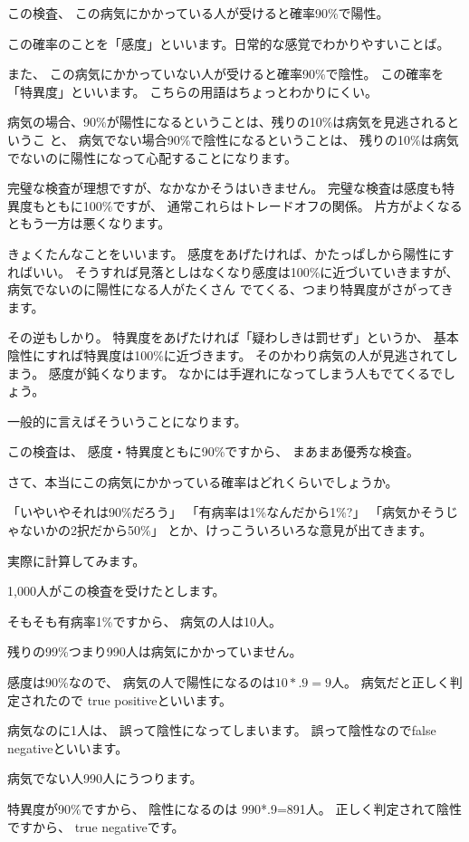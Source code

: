 \documentclass[uplatex,jis2004,dvipdfmx,12pt]{jsarticle}
\begin{document}
この検査、
この病気にかかっている人が受けると確率90\%で陽性。

この確率のことを「感度」といいます。日常的な感覚でわかりやすいことば。

また、
この病気にかかっていない人が受けると確率90\%で陰性。
この確率を「特異度」といいます。
こちらの用語はちょっとわかりにくい。

病気の場合、90\%が陽性になるということは、残りの10\%は病気を見逃されるというこ
と、
病気でない場合90\%で陰性になるということは、
残りの10\%は病気でないのに陽性になって心配することになります。

完璧な検査が理想ですが、なかなかそうはいきません。
完璧な検査は感度も特異度もともに100\%ですが、
通常これらはトレードオフの関係。
片方がよくなるともう一方は悪くなります。

きょくたんなことをいいます。
感度をあげたければ、かたっぱしから陽性にすればいい。
そうすれば見落としはなくなり感度は100\%に近づいていきますが、
病気でないのに陽性になる人がたくさん
でてくる、つまり特異度がさがってきます。

その逆もしかり。
特異度をあげたければ「疑わしきは罰せず」というか、
基本陰性にすれば特異度は100\%に近づきます。
そのかわり病気の人が見逃されてしまう。
感度が鈍くなります。
なかには手遅れになってしまう人もでてくるでしょう。

一般的に言えばそういうことになります。

この検査は、
感度・特異度ともに90\%ですから、
まあまあ優秀な検査。


さて、本当にこの病気にかかっている確率はどれくらいでしょうか。

「いやいやそれは90\%だろう」
「有病率は1\%なんだから1\%?」
「病気かそうじゃないかの2択だから50\%」
とか、けっこういろいろな意見が出てきます。

実際に計算してみます。

1,000人がこの検査を受けたとします。

そもそも有病率1\%ですから、
病気の人は10人。

残りの99\%つまり990人は病気にかかっていません。

感度は90\%なので、
病気の人で陽性になるのは$10*.9=9$人。
病気だと正しく判定されたので
true positiveといいます。

病気なのに1人は、
誤って陰性になってしまいます。
誤って陰性なのでfalse negativeといいます。

病気でない人990人にうつります。

特異度が90\%ですから、
陰性になるのは
990*.9=891人。
正しく判定されて陰性ですから、
true negativeです。
\end{document}
